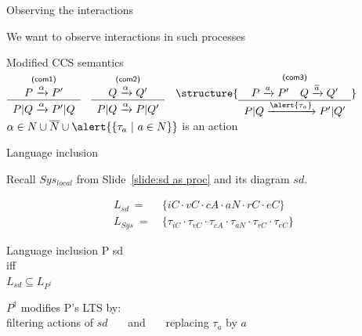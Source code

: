 \documentclass[aspectratio=169]{beamer}
\begin{document}
\begin{slide}{Observing the interactions}

  \centering

  We want to \alert{observe} interactions in such processes

  \begin{block}{Modified CCS semantics}
    \centering
    $
      \typerule{com1}{P\trans\alpha P'}{P|Q\trans\alpha P'|Q}
      ~~~
      \typerule{com2}{Q\trans\alpha Q'}{P|Q\trans\alpha P|Q'}
      ~~~
      \structure{
      \typerule{com3}{P\trans a P' \quad Q\trans{\ainv{a}} Q'}{P|Q\trans{\alert{\tau_a}} P'|Q'}
      }
    $
    \\[5mm]
    $\alpha \in N \cup \overline{N} \cup \alert{\{\tau_a ~|~ a\in N\}}$ is an action

  \end{block}
\end{slide}


\begin{slide}{Language inclusion}
  \centering

  Recall $Sys_{local}$ from Slide~\ref{slide:sd as proc} and its diagram $sd$.

  \begin{align*}
    L_{sd} ~=~& \{iC\cdot vC\cdot cA\cdot aN\cdot rC\cdot eC\}
    \\
    L_{Sys} ~=~& \{\tau_{iC}\cdot\tau_{vC}\cdot\tau_{cA}\cdot\tau_{aN}\cdot\tau_{rC}\cdot\tau_{eC}\}
  \end{align*}
  

  \begin{block}{Language inclusion}
    \centering
    P  sd \\\alert{iff}\\
      $L_{sd} \subseteq L_{P^{\dagger}}$
  \end{block}

  $P^{\dagger}$ modifies P's LTS by:\\filtering actions of $sd$ ~~~and~~~ replacing $\tau_a$ by $a$

\end{slide}
\end{document}
